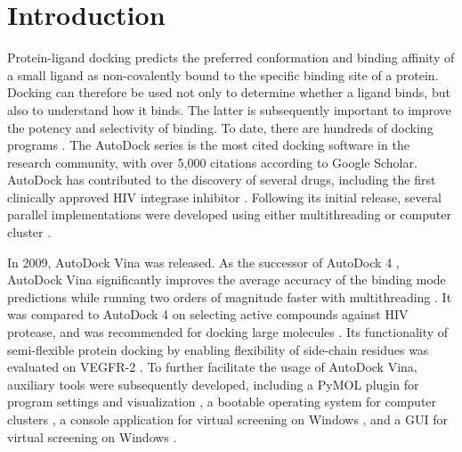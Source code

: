 \documentclass[10pt]{article}
\begin{document}

\section*{Introduction}
Protein-ligand docking predicts the preferred conformation and binding affinity of a small ligand as non-covalently bound to the specific binding site of a protein. Docking can therefore be used not only to determine whether a ligand binds, but also to understand how it binds. The latter is subsequently important to improve the potency and selectivity of binding. To date, there are hundreds of docking programs \cite{493,922}. The AutoDock series \cite{597,596,595} is the most cited docking software in the research community, with over 5,000 citations according to Google Scholar. AutoDock has contributed to the discovery of several drugs, including the first clinically approved HIV integrase inhibitor \cite{1169}. Following its initial release, several parallel implementations were developed using either multithreading or computer cluster \cite{115,560,782}.

In 2009, AutoDock Vina \cite{595} was released. As the successor of AutoDock 4 \cite{596}, AutoDock Vina significantly improves the average accuracy of the binding mode predictions while running two orders of magnitude faster with multithreading \cite{595}. It was compared to AutoDock 4 on selecting active compounds against HIV protease, and was recommended for docking large molecules \cite{556}. Its functionality of semi-flexible protein docking by enabling flexibility of side-chain residues was evaluated on VEGFR-2 \cite{1084}. To further facilitate the usage of AutoDock Vina, auxiliary tools were subsequently developed, including a PyMOL \cite{1221} plugin for program settings and visualization \cite{609}, a bootable operating system for computer clusters \cite{773}, a console application for virtual screening on Windows \cite{1268}, and a GUI for virtual screening on Windows \cite{1250}.
\end{document}
